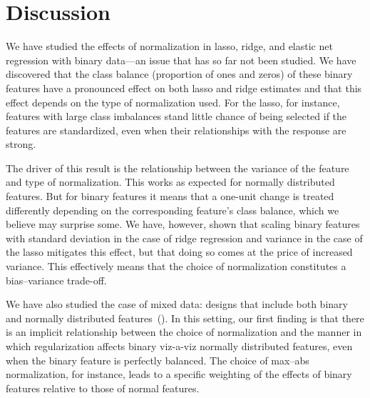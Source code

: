 \section{Discussion}%
\label{sec:discussion}

We have studied the effects of normalization in lasso, ridge, and elastic net regression
with binary data---an issue that has so far not been studied. We have discovered that the
class balance (proportion of ones and zeros) of these binary features have a pronounced
effect on both lasso and ridge estimates and that this effect depends on the type of
normalization used. For the lasso, for instance, features with large class imbalances stand
little chance of being selected if the features are standardized, even when their
relationships with the response are strong.

The driver of this result is the relationship between the variance of the feature and type
of normalization. This works as expected for normally distributed features. But for binary
features it means that a one-unit change is treated differently depending on the
corresponding feature's class balance, which we believe may surprise some. We have,
however, shown that scaling binary features with standard deviation in the case of ridge
regression and variance in the case of the lasso mitigates this effect, but that doing so
comes at the price of increased variance. This effectively means that the choice of
normalization constitutes a bias--variance trade-off.


We have also studied the case of mixed data: designs that include both binary and normally
distributed features~(). In this setting, our first finding is that
there is an implicit relationship between the choice of normalization and the manner in
which regularization affects binary viz-a-viz normally distributed features, even when the
binary feature is perfectly balanced. The choice of max--abs normalization, for instance,
leads to a specific weighting of the effects of binary features relative to those of normal
features.


